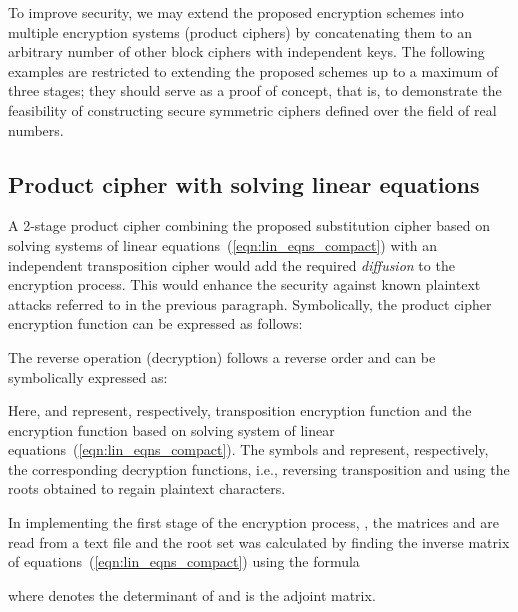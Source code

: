 \documentclass[10pt,journal]{IEEEtran}
\begin{document}
To improve security, we may extend the proposed encryption schemes into 
multiple encryption systems (product ciphers) by concatenating 
them to an arbitrary number of other block ciphers with independent keys. 
The following examples are restricted to extending the proposed schemes 
up to a maximum of three stages; they should serve as a proof of concept,
that is, to demonstrate the feasibility of constructing secure symmetric 
ciphers defined over the field of real numbers.

\subsection{Product cipher with solving linear equations}
\label{ssec:product_cipher_lin_eqns}
A 2-stage product cipher combining the proposed substitution cipher
based on solving systems of linear
equations~(\ref{eqn:lin_eqns_compact}) with an independent
transposition cipher would add the required \emph{diffusion} to the
encryption process. This would enhance the security against known 
plaintext attacks referred to in the previous paragraph. 
Symbolically, the product cipher encryption function can be
expressed as follows:

  

The reverse operation (decryption) follows a reverse order and can be
symbolically expressed as:


  
Here,  and  represent, respectively,
transposition encryption function and the encryption function based on
solving system of linear equations~(\ref{eqn:lin_eqns_compact}). The
symbols  and  represent, respectively, the
corresponding decryption functions, i.e., reversing transposition and
using the roots obtained to regain plaintext characters.
\newline

In implementing the first stage of the encryption process,
, the matrices  and  are read from a
text file and the root set  was calculated by finding the
inverse matrix of equations~(\ref{eqn:lin_eqns_compact}) using the
formula

where  denotes the determinant of  and  is the adjoint matrix.
\newline 
\end{document}
